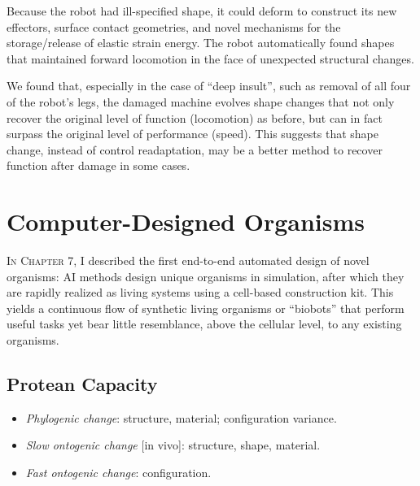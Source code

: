 Because the robot had ill-specified shape,
it could deform to construct its new effectors, surface contact geometries, and novel mechanisms for the storage/release of elastic strain energy.
The robot automatically found shapes that maintained forward locomotion in the face of unexpected structural changes.

We found that, especially in the case of ``deep insult'', such as removal of all four of the robot's legs, the damaged machine evolves shape changes that not only recover the original level of function (locomotion) as before, but can in fact surpass the original level of performance (speed).
This suggests that shape change, instead of control readaptation, may be a better method to recover function after damage in some cases.






\section{Computer-Designed Organisms}


\textsc{In Chapter 7,}
I described the first end-to-end automated design of novel organisms: AI methods design unique organisms in simulation, after which they are rapidly realized as living systems using a cell-based construction kit. 
This yields a continuous flow of synthetic living organisms or ``biobots'' that perform useful tasks yet bear little resemblance, above the cellular level, to any existing organisms. 



\subsection{Protean Capacity}

\begin{itemize}
    \item \textit{Phylogenic change}: structure, material; configuration variance.
    \item \textit{Slow ontogenic change} [in vivo]: structure, shape, material.
    \item \textit{Fast ontogenic change}: configuration.
\end{itemize}


